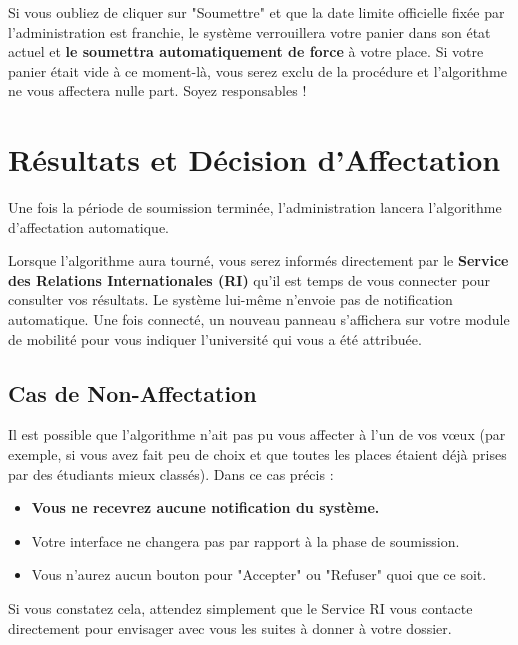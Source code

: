 \documentclass[12pt,a4paper]{article}
\begin{document}
\begin{tcolorbox}[colback=red!5!white,colframe=red!75!black,title=⚠️ CONSÉQUENCE DU RETARD DE SOUMISSION]
Si vous oubliez de cliquer sur "Soumettre" et que la date limite officielle fixée par l'administration est franchie, le système verrouillera votre panier dans son état actuel et \textbf{le soumettra automatiquement de force} à votre place.
\newline Si votre panier était vide à ce moment-là, vous serez exclu de la procédure et l'algorithme ne vous affectera nulle part. Soyez responsables !
\end{tcolorbox}

\section{Résultats et Décision d'Affectation}
Une fois la période de soumission terminée, l'administration lancera l'algorithme d'affectation automatique.

Lorsque l'algorithme aura tourné, vous serez informés directement par le \textbf{Service des Relations Internationales (RI)} qu'il est temps de vous connecter pour consulter vos résultats. Le système lui-même n'envoie pas de notification automatique. Une fois connecté, un nouveau panneau s'affichera sur votre module de mobilité pour vous indiquer l'université qui vous a été attribuée.

\subsection{Cas de Non-Affectation}
Il est possible que l'algorithme n'ait pas pu vous affecter à l'un de vos vœux (par exemple, si vous avez fait peu de choix et que toutes les places étaient déjà prises par des étudiants mieux classés).
\newline Dans ce cas précis :
\begin{itemize}
    \item \textbf{Vous ne recevrez aucune notification du système.}
    \item Votre interface ne changera pas par rapport à la phase de soumission.
    \item Vous n'aurez aucun bouton pour "Accepter" ou "Refuser" quoi que ce soit.
\end{itemize}
Si vous constatez cela, attendez simplement que le Service RI vous contacte directement pour envisager avec vous les suites à donner à votre dossier.
\end{document}
